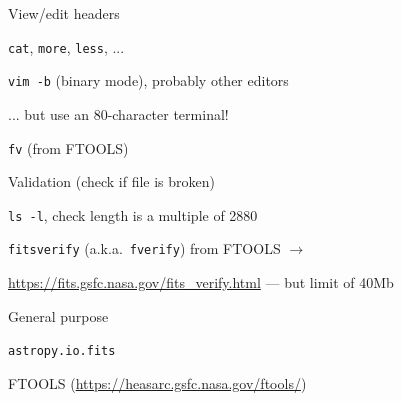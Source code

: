 \documentclass[20pt,landscape]{foils}
\newcommand{\burl}[1]{{\color{blue}\url{#1}}}
\begin{document}
\begin{list1}
\vspace*{-0.2cm}
  \item View/edit headers
\vspace*{-0.2cm}
  \begin{list2}
\vspace*{-0.2cm}
    \item {\color{brown}\tt cat},
          {\color{brown}\tt more},
          {\color{brown}\tt less}, ...
\vspace*{-0.2cm}
    \item {\color{brown}\tt vim -b} (binary mode), probably other editors
\vspace*{-0.2cm}
    \item[] \hspace*{1em} ... but use an 80-character terminal!
\vspace*{-0.2cm}
    \item {\color{brown}\tt fv} (from FTOOLS)
  \end{list2}
\vspace*{-0.2cm}
  \item Validation (check if file is broken)
\vspace*{-0.2cm}
  \begin{list2}
\vspace*{-0.2cm}
    \item {\color{brown}\tt ls -l}, check length is a multiple of 2880
\vspace*{-0.2cm}
    \item {\color{brown}\tt fitsverify} (a.k.a.\ {\color{brown}\tt fverify})
          from FTOOLS
          \hspace*{2em} {\color{darkgrey}$\longrightarrow$}
\vspace*{-0.2cm}
    \item \burl{https://fits.gsfc.nasa.gov/fits_verify.html}
          --- but limit of 40Mb
  \end{list2}
\vspace*{-0.2cm}
  \item General purpose
\vspace*{-0.2cm}
  \begin{list2}
\vspace*{-0.2cm}
    \item {\tt astropy.io.fits}
\vspace*{-0.2cm}
    \item FTOOLS (\burl{https://heasarc.gsfc.nasa.gov/ftools/})
\vspace*{-0.2cm}

\end{list2}
\end{list1}
\end{document}

